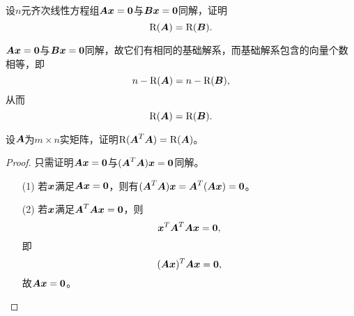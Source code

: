 \begin{frame}

\begin{li}
  设$n$元齐次线性方程组$\A\xx=\zero$与$\B\xx=\zero$同解，证明
  $$
  \rank(\A)=\rank(\B).
  $$
\end{li}
\pause 
\begin{jie}
$\A\xx=\zero$与$\B\xx=\zero$同解，故它们有相同的基础解系，而基础解系包含的向量个数相等，即
$$
n-\rank(\A)=n-\rank(\B),
$$
从而
$$
\rank(\A)=\rank(\B).
$$
\end{jie}
\end{frame}


\begin{frame}
\begin{li}
  设$\A$为$m\times n$实矩阵，证明$\rank(\A^T\A)=\rank(\A)$。    
\end{li}
\pause 
\begin{proof}
只需证明$\A\xx=\zero$与$(\A^T\A)\xx=\zero$同解。
\begin{itemize}
\item[(1)] 若$\xx$满足$\A\xx=\zero$，则有$(\A^T\A)\xx=\A^T(\A\xx)=\zero$。 
\item[(2)] 若$\xx$满足$\A^T\A\xx=\zero$，则
  $$
  \xx^T\A^T\A\xx=\zero,
  $$
  即
  $$
  (\A\xx)^T\A\xx=\zero,
  $$
  故$\A\xx=\zero$。
\end{itemize}
\end{proof}
\end{frame}

